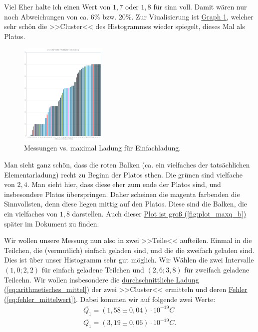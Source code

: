 Viel Eher halte ich einen Wert von $1,7$ oder $1,8$ für sinn voll. Damit wären nur noch Abweichungen von ca. $6\%$ bzw. $20\%$. 
Zur Viualisierung ist \hyperref[fig:plot_maxq]{Graph \ref*{fig:plot_maxq}}, welcher sehr schön die >>Cluster<< des Histogrammes wieder spiegelt,
dieses Mal als Platos. 

\begin{figure}[h]
    \centering
    \includegraphics[width=0.37\textwidth]{img/22/Plot_MaxQ.png}
    \caption{Messungen vs. maximal Ladung für Einfachladung.}
    \label{fig:plot_maxq}
\end{figure}

Man sieht ganz schön, dass die roten Balken (ca. ein vielfaches der tatsächlichen Elementarladung) recht zu Beginn der Platos sthen.
Die grünen sind vielfache von $2,4$. Man sieht hier, dass diese eher zum ende der Platos sind, und insbesondere Platos überspringen. 
Daher scheinen die magenta farbenden die Sinnvollsten, denn diese liegen mittig auf den Platos. Diese sind die Balken, die ein vielfaches von $1,8$ darstellen. 
Auch dieser \hyperref[fig:plot_maxq_b]{Plot ist groß (\ref*{fig:plot_maxq_b})} später im Dokument zu finden.

Wir wollen unsere Messung nun also in zwei >>Teile<< aufteilen. Einmal in die Teilchen, die (vermutlich) einfach geladen sind, und die die zweifach geladen sind. 
Dies ist über unser Histogramm sehr gut möglich. Wir Wählen die zwei Intervalle $(1,0; 2,2)$ für einfach geladene Teilchen und $(2,6;3,8)$ für zweifach geladene Teilcehn.
Wir wollen insbesondere die \hyperref[eq:arithmetisches_mittel]{durchschnittliche Ladung (\ref*{eq:arithmetisches_mittel})} der zwei >>Cluster<< ermitteln und deren \hyperref[eq:fehler_mittelwert]{Fehler (\ref*{eq:fehler_mittelwert})}.
Dabei kommen wir auf folgende zwei Werte:
\begin{align}
    \overline{Q_1} = (1,58 \pm 0,04) \cdot 10^{-19}C \\
    \overline{Q_1} = (3,19 \pm 0,06) \cdot 10^{-19}C.
\end{align}

